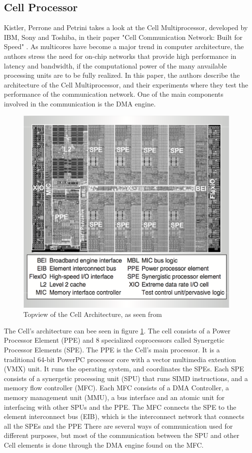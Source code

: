 \subsection{Cell Processor}
Kistler, Perrone and Petrini takes a look at the Cell Multiprocessor, developed by IBM, Sony and Toshiba, in their paper "Cell Communication Network: Built for Speed" \cite{cell}.
As multicores have become a major trend in computer architecture, the authors stress the need for on-chip networks that provide high performance in latency and bandwidth, if the computational power of the many anvailable processing units are to be fully realized.
In this paper, the authors describe the architecture of the Cell Multiprocessor, and their experiments where they test the performance of the communication network.
One of the main components involved in the communication is the DMA engine.

\begin{figure}[h!]
    \centering
    \includegraphics[width=1\textwidth]{Figures/DMA/CellTop}
    \caption{Topview of the Cell Architecture, as seen from \cite{cell}}
    \label{fig:CellTop}
\end{figure}

The Cell's architecture can bee seen in figure \ref{fig:CellTop}.
The cell consists of a Power Processor Element (PPE) and 8 specialized coprocessors called Synergetic Processor Elements (SPE).
The PPE is the Cell's main processor.
It is a traditional 64-bit PowerPC processor core with a vector multimedia extention (VMX) unit.
It runs the operating system, and coordinates the SPEs.
Each SPE consists of a synergetic processing unit (SPU) that runs SIMD instructions, and a memory flow controller (MFC).
Each MFC consists of a DMA Controller, a memory management unit (MMU), a bus interface and an atomic unit for interfacing with other SPUs and the PPE.
The MFC connects the SPE to the element interconnect bus (EIB), which is the interconnect network that connects all the SPEs and the PPE
There are several ways of communication used for different purposes, but most of the communication between the SPU and other Cell elements is done through the DMA engine found on the MFC.

